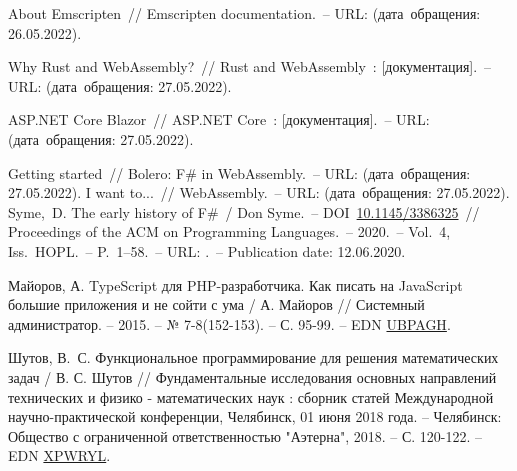 \begin{thebibliography}{00}
      About Emscripten~// Emscripten documentation.~--
      URL: \underline{}
      (дата~обращения: 26.05.2022).
      
      Why Rust and WebAssembly?~// Rust and WebAssembly~: [документация].~--
      URL: \underline{}
      (дата~обращения: 27.05.2022).
    
      ASP.NET Core Blazor~// ASP.NET Core~: [документация].~--
      URL: \underline{}
      (дата~обращения: 27.05.2022).
    
      Getting started~// Bolero: F\# in WebAssembly.~--
      URL: \underline{}
      (дата~обращения: 27.05.2022). 
      I want to...~// WebAssembly.~--
      URL: \underline{}
      (дата~обращения: 27.05.2022). 
      Syme,~D. The early history of F\#~/ Don Syme.~--
      DOI~\href{https://doi.org/10.1145/3386325}{10.1145/3386325}~//
      Proceedings of the ACM on Programming Languages.~--
      2020.~--
      Vol.~4, Iss.~HOPL.~--
      P.~1--58.~--
      URL: \underline{}.~--
      Publication date: 12.06.2020.
      
      Майоров, А. TypeScript для PHP-разработчика. Как писать на JavaScript большие приложения и не сойти с ума /
    А. Майоров // Системный администратор. – 2015. – № 7-8(152-153). – С. 95-99. -- EDN \href{https://www.elibrary.ru/UBPAGH}{UBPAGH}.
      
      Шутов, В.~С. Функциональное программирование для решения математических задач
    / В. С. Шутов // Фундаментальные исследования основных направлений технических и физико - математических наук
    : сборник статей Международной научно-практической конференции, Челябинск, 01 июня 2018 года.
    – Челябинск: Общество с ограниченной ответственностью "Аэтерна", 2018. – С. 120-122. -- EDN \href{https://www.elibrary.ru/XPWRYL}{XPWRYL}.
      

\end{thebibliography}
